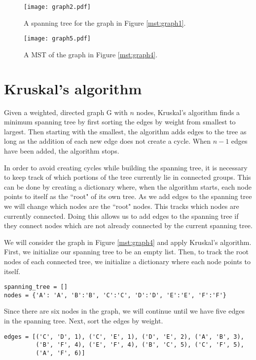 \begin{figure}[H]
\texttt{[image: graph2.pdf]}
\caption{A spanning tree for the graph in Figure \ref{mst:graph1}.}
\label{mst:graph2}
\end{figure}

\begin{figure}[H]
\texttt{[image: graph5.pdf]}
\caption{A MST of the graph in Figure \ref{mst:graph4}.}
\label{mst:graph5}
\end{figure}

\section*{Kruskal's algorithm}

Given a weighted, directed graph G with $n$ nodes, Kruskal's algorithm finds a minimum spanning tree by first sorting the edges by weight from smallest to largest.
Then starting with the smallest, the algorithm adds edges to the tree as long as the addition of each new edge does not create a cycle.
When $n-1$ edges have been added, the algorithm stops.

In order to avoid creating cycles while building the spanning tree, it is necessary to keep track of which portions of the tree currently lie in connected groups.
This can be done by creating a dictionary where, when the algorithm starts, each node points to itself as the ``root" of its own tree.
As we add edges to the spanning tree we will change which nodes are the ``root" nodes. This tracks which nodes are currently connected.
Doing this allows us to add edges to the spanning tree if they connect nodes which are not already connected by the current spanning tree.

We will consider the graph in Figure \ref{mst:graph4} and apply Kruskal's algorithm.
First, we initialize our spanning tree to be an empty list. Then, to track the root nodes of each connected tree, we initialize a dictionary where each node points to itself.

\begin{lstlisting}
spanning_tree = []
nodes = {'A': 'A', 'B':'B', 'C':'C', 'D':'D', 'E':'E', 'F':'F'}
\end{lstlisting}
Since there are six nodes in the graph, we will continue until we have five edges in the spanning tree.
Next, sort the edges by weight.

\begin{lstlisting}
edges = [('C', 'D', 1), ('C', 'E', 1), ('D', 'E', 2), ('A', 'B', 3), 
	     ('B', 'F', 4), ('E', 'F', 4), ('B', 'C', 5), ('C', 'F', 5), 
	     ('A', 'F', 6)]
\end{lstlisting}

